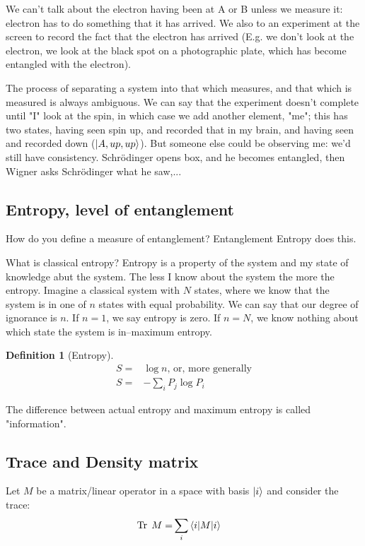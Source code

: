 \documentclass[]{article}
\newtheorem{defn}[thm]{Definition}
\DeclareMathOperator{\Tr}{Tr \;}
\begin{document}
We can't talk about the electron having been at A or B unless we measure it: electron has to do something that it has arrived. We also to an experiment at the screen to record the fact that the electron has arrived (E.g. we don't look at the electron, we look at the black spot on a photographic plate, which has become entangled with the electron).

The process of separating a system into that which measures, and that which is measured is always ambiguous. We can say that the experiment doesn't complete until "I" look at the spin, in which case we add another element, "me"; this has two states, having seen spin up, and recorded that in my brain, and having seen and recorded down ($\ket{A,up,up}$). But someone else could be observing me: we'd still have consistency. Schr\"odinger opens box, and he becomes entangled, then Wigner asks Schr\"odinger what he saw,...

\subsection{Entropy, level of entanglement}  

How do you define a measure of entanglement? Entanglement Entropy does this.

What is classical entropy? Entropy is a property of the system and my state of knowledge abut the system. The less I know about the system the more the entropy. Imagine a classical system with $N$ states, where we know that the system is in one of $n$ states with equal probability. We can say that our degree of ignorance is $n$. If $n=1$, we say entropy is zero. If $n=N$, we know nothing about which state the system is in--maximum entropy.
\begin{defn}[Entropy]
	\begin{align*}
		S=&\log{n}\text{, or, more generally}\\
		S =&- \sum_i P_j \log{P_i}
	\end{align*}
\end{defn}

The difference between actual entropy and maximum entropy is called "information".

\subsection{Trace and Density matrix }

Let $M$ be a matrix/linear operator in a space with basis $\ket{i}$ and consider the trace:
\begin{align*}
	\Tr M =& \sum_i \braket{i\vert M \vert i}
\end{align*}
\end{document}
